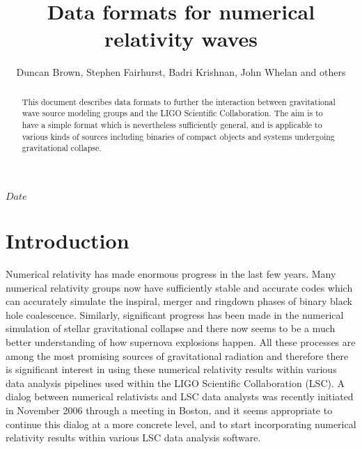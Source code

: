 \documentclass[10pt]{ligodcc}
\title{Data formats for numerical relativity waves}
\author{Duncan Brown, Stephen Fairhurst, Badri Krishnan, John Whelan and others}
\begin{document}
\maketitle


\tableofcontents

\newcommand{\Ys}{{{}^sY}}
\newcommand{\Ytwo}{{{}^{-2}Y}}
\newcommand{\tens}[1]{\overleftrightarrow{#1}}
\newcommand{\xhat}{\vec{e}_x}
\newcommand{\yhat}{\vec{e}_y}
\newcommand{\zhat}{\vec{e}_z}
\newcommand{\ihat}{\vec{e}_i}
\newcommand{\jhat}{\vec{e}_j}
\newcommand{\rhat}{\vec{e}_{r}}
\newcommand{\that}{\vec{e}_{t}}
\newcommand{\iotahat}{\vec{e}_{\iota}}
\newcommand{\phihat}{\vec{e}_{\phi}}
\newcommand{\eplus}{\tens{e}_+}
\newcommand{\ecross}{\tens{e}_\times}

\newcommand{\ellhat}{\vec{\ell}}
\newcommand{\nhat}{\vec{n}}
\newcommand{\mhat}{\vec{m}}
\newcommand{\mbarhat}{\vec{\bar{m}}}

\RCS $Date$
\date{\RCSDate}

\begin{abstract}
  This document describes data formats to further the interaction
  between gravitational wave source modeling groups and the LIGO
  Scientific Collaboration. The aim is to have a simple format which
  is nevertheless sufficiently general, and is applicable to various
  kinds of sources including binaries of compact objects and systems
  undergoing gravitational collapse.
\end{abstract}

\section{Introduction}
\label{sec:intro}

Numerical relativity has made enormous progress in the last few years.
Many numerical relativity groups now have sufficiently stable and
accurate codes which can accurately simulate the inspiral, merger and
ringdown phases of binary black hole coalescence.  Similarly,
significant progress has been made in the numerical simulation of
stellar gravitational collapse and there now seems to be a much better
understanding of how supernova explosions happen.  All these processes
are among the most promising sources of gravitational radiation and
therefore there is significant interest in using these numerical
relativity results within various data analysis pipelines used within
the LIGO Scientific Collaboration (LSC).  A dialog between numerical
relativists and LSC data analysts was recently initiated in November
2006 through a meeting in Boston, and it seems appropriate to continue
this dialog at a more concrete level, and to start incorporating
numerical relativity results within various LSC data analysis
software.
\end{document}
